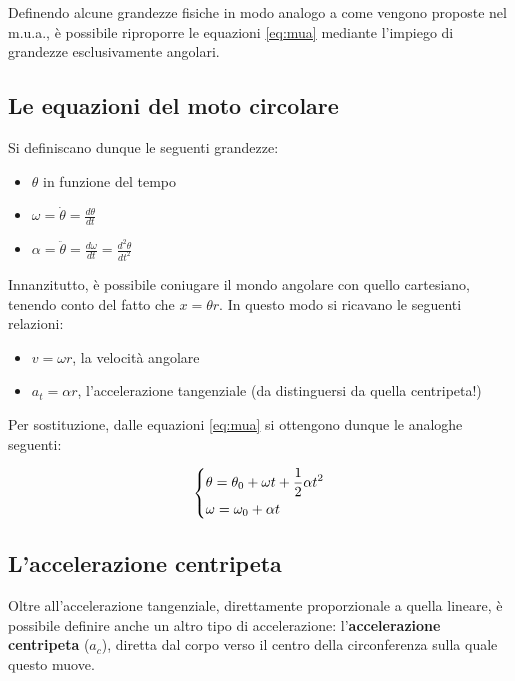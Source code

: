 \documentclass[oneside]{book}
\begin{document}
Definendo alcune grandezze fisiche in modo analogo a come vengono
proposte nel m.u.a., è possibile riproporre le equazioni \ref{eq:mua}
mediante l'impiego di grandezze esclusivamente angolari.

\subsection{Le equazioni del moto circolare}

Si definiscano dunque le seguenti grandezze:

\begin{itemize}
    \item $\theta$ in funzione del tempo
    \item $\displaystyle \omega=\dot{\theta}=\frac{d\theta}{dt}$
    \item $\displaystyle \alpha=\ddot{\theta}=\frac{d\omega}{dt}=\frac{d^2\theta}{dt^2}$
\end{itemize}

Innanzitutto, è possibile coniugare il mondo angolare con quello
cartesiano, tenendo conto del fatto che $x=\theta r$. In questo modo
si ricavano le seguenti relazioni:

\begin{itemize}
    \item $\displaystyle v=\omega r$, la velocità angolare
    \item $\displaystyle a_t=\alpha r$, l'accelerazione tangenziale
    (da distinguersi da quella centripeta!)
\end{itemize}

Per sostituzione, dalle equazioni \ref{eq:mua} si ottengono dunque
le analoghe seguenti:

\begin{equation}
    \begin{dcases}
        \theta = \theta_0 + \omega t + \frac12 \alpha t^2 \\
        \omega = \omega_0 + \alpha t
    \end{dcases}
\end{equation}

\subsection{L'accelerazione centripeta}

Oltre all'accelerazione tangenziale, direttamente proporzionale a
quella lineare, è possibile definire anche un altro tipo di
accelerazione: l'\textbf{accelerazione centripeta} ($a_c$), diretta dal
corpo verso il centro della circonferenza sulla quale questo muove.
\end{document}
